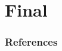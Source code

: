 \documentclass[11pt]{beamer}
\begin{document}










\section{Final}\label{final}



\begin{frame}[allowframebreaks]
        \tiny
        \frametitle{References}
        
          
\end{frame}
\end{document}
